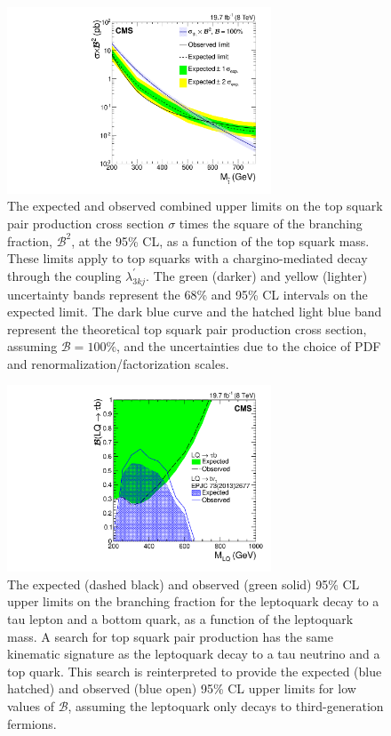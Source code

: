 \begin{figure}[htbp]
\centering
    \includegraphics[width=0.7\textwidth]{figures/final/BR_Sigma_TauTau_LQD.pdf}
    \caption{The expected and observed combined upper limits on the top squark pair production cross section $\sigma$ times the square of the branching fraction, $\mathcal{B}^2$, at the 95\% CL, as a function of the top squark mass. These limits apply to top squarks with a chargino-mediated decay through the coupling $\lambda^{\prime}_{3kj}$. The green (darker) and yellow (lighter) uncertainty bands represent the 68\% and 95\% CL intervals on the expected limit. The dark blue curve and the hatched light blue band represent the theoretical top squark pair production cross section, assuming $\mathcal{B}=100\%$, and the uncertainties due to the choice of PDF and renormalization/factorization scales.}
    \label{Res:fig:asymptoticCombLQD}
\end{figure}

\begin{figure}[htbp]
\centering
    \includegraphics[width=0.7\textwidth]{figures/final/limit_beta_vs_mass_btau_topnu.pdf}
    \caption{The expected (dashed black) and observed (green solid) 95\% CL upper limits on the branching fraction for the leptoquark decay to a tau lepton and a bottom quark, as a function of the leptoquark mass. A search for top squark pair production \cite{SUS-13-011} has the same kinematic signature as the leptoquark decay to a tau neutrino and a top quark. This search is reinterpreted to provide the expected (blue hatched) and observed (blue open) 95\% CL upper limits for low values of $\mathcal{B}$, assuming the leptoquark only decays to third-generation fermions.}
    \label{Res:fig:2DCombLQ}
\end{figure}